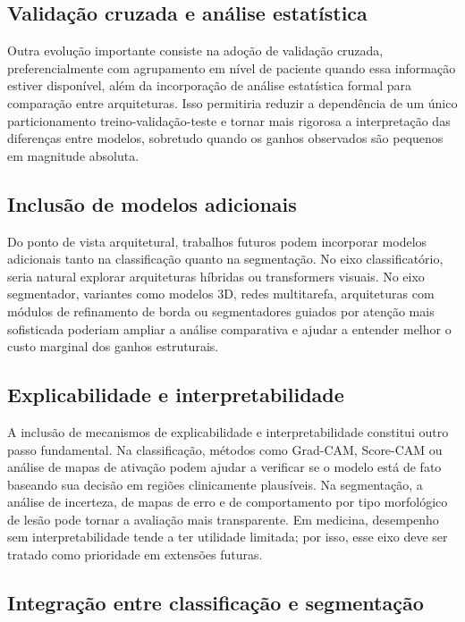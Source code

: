 \documentclass[tcc,capa]{texufpel}
\begin{document}
\subsection{Validação cruzada e análise estatística}

Outra evolução importante consiste na adoção de validação cruzada, preferencialmente com agrupamento em nível de paciente quando essa informação estiver disponível, além da incorporação de análise estatística formal para comparação entre arquiteturas. Isso permitiria reduzir a dependência de um único particionamento treino-validação-teste e tornar mais rigorosa a interpretação das diferenças entre modelos, sobretudo quando os ganhos observados são pequenos em magnitude absoluta.

\subsection{Inclusão de modelos adicionais}

Do ponto de vista arquitetural, trabalhos futuros podem incorporar modelos adicionais tanto na classificação quanto na segmentação. No eixo classificatório, seria natural explorar arquiteturas híbridas ou transformers visuais. No eixo segmentador, variantes como modelos 3D, redes multitarefa, arquiteturas com módulos de refinamento de borda ou segmentadores guiados por atenção mais sofisticada poderiam ampliar a análise comparativa e ajudar a entender melhor o custo marginal dos ganhos estruturais.

\subsection{Explicabilidade e interpretabilidade}

A inclusão de mecanismos de explicabilidade e interpretabilidade constitui outro passo fundamental. Na classificação, métodos como Grad-CAM, Score-CAM ou análise de mapas de ativação podem ajudar a verificar se o modelo está de fato baseando sua decisão em regiões clinicamente plausíveis. Na segmentação, a análise de incerteza, de mapas de erro e de comportamento por tipo morfológico de lesão pode tornar a avaliação mais transparente. Em medicina, desempenho sem interpretabilidade tende a ter utilidade limitada; por isso, esse eixo deve ser tratado como prioridade em extensões futuras.

\subsection{Integração entre classificação e segmentação}
\end{document}
